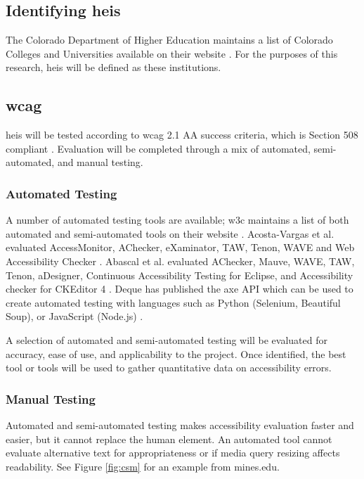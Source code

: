 \documentclass{article}
\begin{document}
\subsection{Identifying \acrlong{heis}}

The Colorado Department of Higher Education maintains a list of Colorado Colleges and Universities available on their website \cite{cdhe}. For the purposes of this research, \acrlong{heis} will be defined as these institutions.

\subsection{\acrlong{wcag}}

\acrshort{heis} will be tested according to \acrshort{wcag} 2.1 AA success criteria, which is Section 508 compliant \cite{wcag}. Evaluation will be completed through a mix of automated, semi-automated, and manual testing.

\subsubsection{Automated Testing}

A number of automated testing tools are available; \acrshort{w3c} maintains a list of both automated and semi-automated tools on their website \cite{tools}. Acosta-Vargas et al. evaluated AccessMonitor, AChecker, eXaminator, TAW, Tenon, WAVE and Web Accessibility Checker \cite{acosta}. Abascal et al. evaluated AChecker, Mauve, WAVE, TAW, Tenon, aDesigner, Continuous Accessibility Testing for Eclipse, and Accessibility checker for CKEditor 4 \cite{abascal}. Deque has published the axe API which can be used to create automated testing with languages such as Python (Selenium, Beautiful Soup), or JavaScript (Node.js) \cite{axe}.

A selection of automated and semi-automated testing will be evaluated for accuracy, ease of use, and applicability to the project. Once identified, the best tool or tools will be used to gather quantitative data on accessibility errors.

\subsubsection{Manual Testing}

Automated and semi-automated testing makes accessibility evaluation faster and easier, but it cannot replace the human element. An automated tool cannot evaluate alternative text for appropriateness or if media query resizing affects readability. See Figure \ref{fig:csm} for an example from mines.edu.
\end{document}
